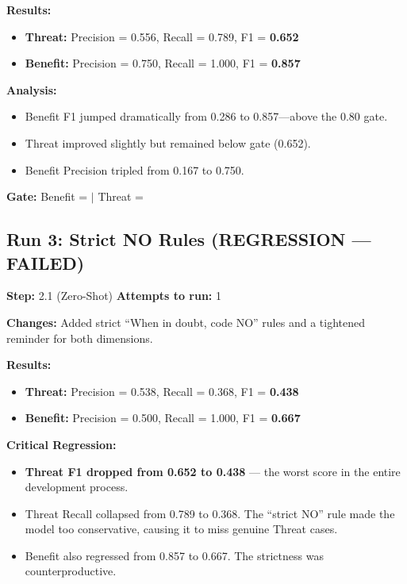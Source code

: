 \textbf{Results:}
\begin{itemize}
    \item \textbf{Threat:} Precision = 0.556, Recall = 0.789, F1 = \textbf{0.652}
    \item \textbf{Benefit:} Precision = 0.750, Recall = 1.000, F1 = \textbf{0.857}
\end{itemize}

\textbf{Analysis:}
\begin{itemize}
    \item Benefit F1 jumped dramatically from 0.286 to 0.857---above the 0.80 gate.
    \item Threat improved slightly but remained below gate (0.652).
    \item Benefit Precision tripled from 0.167 to 0.750.
\end{itemize}

\textbf{Gate:} Benefit = \passmark $|$ Threat = \failmark

\subsection{Run 3: Strict NO Rules (REGRESSION --- FAILED)}
\label{sec:run3}

\textbf{Step:} 2.1 (Zero-Shot) \quad \textbf{Attempts to run:} 1

\textbf{Changes:} Added strict ``When in doubt, code NO'' rules and a tightened reminder for both dimensions.

\textbf{Results:}
\begin{itemize}
    \item \textbf{Threat:} Precision = 0.538, Recall = 0.368, F1 = \textbf{0.438}
    \item \textbf{Benefit:} Precision = 0.500, Recall = 1.000, F1 = \textbf{0.667}
\end{itemize}

\textbf{Critical Regression:}
\begin{itemize}
    \item \textcolor{fail}{\textbf{Threat F1 dropped from 0.652 to 0.438}} --- the worst score in the entire development process.
    \item Threat Recall collapsed from 0.789 to 0.368. The ``strict NO'' rule made the model too conservative, causing it to miss genuine Threat cases.
    \item Benefit also regressed from 0.857 to 0.667. The strictness was counterproductive.
\end{itemize}

